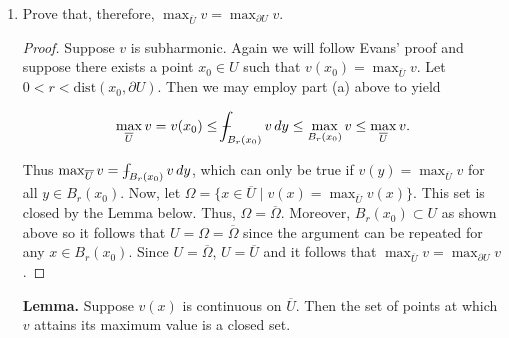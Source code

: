 \documentclass[11pt,oneside,english]{amsart}
\theoremstyle{definition}
\newcommand{\dd}[2]{\frac{d{#1}}{d{#2}}}
\newcommand{\pp}[2]{\frac{\partial{#1}}{\partial{#2}}}
\def\Xint#1{\mathchoice
{\XXint\displaystyle\textstyle{#1}}%
{\XXint\textstyle\scriptstyle{#1}}%
{\XXint\scriptstyle\scriptscriptstyle{#1}}%
{\XXint\scriptscriptstyle\scriptscriptstyle{#1}}%
\!\int}
\def\XXint#1#2#3{{\setbox0=\hbox{$#1{#2#3}{\int}$ }
\vcenter{\hbox{$#2#3$ }}\kern-.6\wd0}}
\def\dashint{\Xint-}
\begin{document}
\begin{enumerate}
\begin{enumerate}
\begin{proof}
\begin{align*}
\dd{\phi}{r}&=\dd{}{r}\dashint_{\partial B_1(0)}v(x+rz)\,dS_z\\[2mm]
&=\dashint_{\partial B_1(0)}Dv(x+rz)\cdot z\,dS_z\\[2mm]
&=\dashint_{\partial B_1(0)}Dv(x+rz)\cdot \frac{y-x}{r}\,dS_z\\[2mm]
&=\dashint_{\partial B_1(0)}Dv\cdot \mathbf{n}\,dS_z\\[2mm]
&=\dashint_{\partial B_1(0)}\pp{v}{\mathbf{n}}\,dS_z\\[2mm]
&=\dashint_{B_1(0)}\Delta v(x+rz)\,dz\\[2mm]
&=\frac{r}{n}\dashint_{B_r(x)}\Delta(y)\,dy\geq0.\\[2mm]
\end{align*}

Thus, the mean value of $v$ over the surface of any sphere inside $U$ is increasing as $r$ increases. We also know that when $r=0$, $\phi(r)=v(x)$, therefore

\[
\dashint_{B_r(x)} v\,dy\geq v(x)
\]

as required.
\end{proof}

\item Prove that, therefore, $\displaystyle \max_{\overline{U}}v=\max_{\partial U}v$.

\begin{proof}
Suppose $v$ is subharmonic. Again we will follow Evans' proof and suppose there exists a point $x_0\in U$ such that $v(x_0)=\max_{\overline{U}}v$. Let $0<r<\text{dist}(x_0,\partial U)$. Then we may employ part (a) above to yield

\[
\max_{\overline{U}}v=v(x_0)\leq \dashint_{B_r(x_0)} v\,dy\leq \max_{B_r(x_0)}v\leq\max_{\overline{U}}v.
\]

Thus $\max_{\overline{U}}v= \dashint_{B_r(x_0)} v\,dy$, which can only be true if $v(y)=\max_{\overline{U}}v$ for all $y\in B_r(x_0)$. Now, let $\Omega=\{x\in \overline{U}\mid v(x)=\max_{\overline{U}}v(x)\}$. This set is closed by the Lemma below. Thus, $\Omega=\overline{\Omega}$. Moreover, $B_r(x_0)\subset U$ as shown above so it follows that $U=\Omega=\overline{\Omega}$ since the argument can be repeated for any $x\in B_r(x_0)$. Since $U=\overline{\Omega}$, $U=\overline{U}$ and it follows that $\displaystyle \max_{\overline{U}}v=\max_{\partial U}v$.
\end{proof}

\textbf{Lemma.} Suppose $v(x)$ is continuous on $\overline{U}$. Then the set of points at which $v$ attains its maximum value is a closed set.


\end{enumerate}
\end{enumerate}
\end{document}
